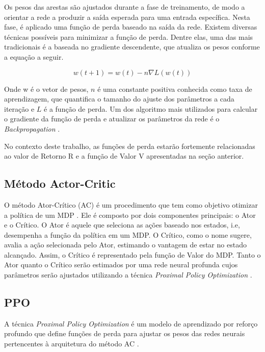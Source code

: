 Os pesos das arestas são ajustados durante a fase de treinamento,  de modo a orientar a rede a produzir a saída esperada para uma entrada específica. 
Nesta fase, é aplicado uma função de perda baseado na saída da rede. 
Existem diversas técnicas possíveis para minimizar a função de perda. 
Dentre elas, uma das mais tradicionais é a baseada no gradiente descendente, que atualiza os pesos conforme a equação a seguir. 

\begin{equation}
    w(t +1) = w(t) - n\nabla L(w(t)) 
\end{equation}

Onde w é o vetor de pesos, $n$ é uma constante positiva conhecida como taxa de aprendizagem, 
que quantifica o tamanho do ajuste dos parâmetros a cada iteração e $L$ é a função de perda. 
Um dos algoritmo mais utilizados para calcular o gradiente da função de perda e atualizar os parâmetros da rede é o \textit{Backpropagation} \cite{Bishop}. 

No contexto deste trabalho, as funções de perda estarão fortemente relacionadas ao valor de Retorno R e a função de Valor V apresentadas na seção anterior. 


\subsection{Método Actor-Critic}

O método Ator-Crítico (AC) é um procedimento que tem como objetivo otimizar a política de um MDP \cite{AC}. 
Ele é composto por dois componentes principais: o Ator e o Crítico. 
O Ator é aquele que seleciona as ações baseado nos estados, i.e, desempenha a função da política em um MDP. 
O Crítico, como o nome sugere, avalia a ação selecionada pelo Ator, estimando o vantagem de estar no estado alcançado. 
Assim, o Crítico é representado pela função de Valor do MDP. 
Tanto o Ator quanto o Crítico serão estimados por uma rede neural profunda cujos parâmetros serão ajustados utilizando a técnica \textit{Proximal Policy Optimization} \cite{PPO}.


\subsection{PPO}

A técnica \textit{Proximal Policy Optimization} é um modelo de aprendizado por reforço profundo que define funções de perda para ajustar os pesos das redes neurais pertencentes à arquitetura do método AC \cite{PPO}. 

